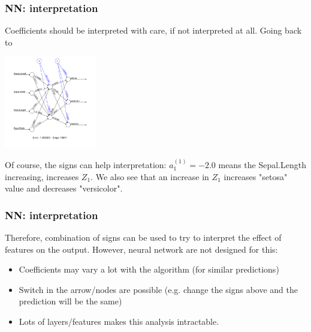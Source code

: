 \begin{frame}
\frametitle{NN: interpretation}
Coefficients should be interpreted with care, if not interpreted at all. Going back to
\begin{center}
\includegraphics[width=4cm]{../../Graphs/NN_Iris.png}
\end{center}
Of course, the signs can help interpretation: $a_1^{(1)}=-2.0$ means the Sepal.Length increasing, increases $Z_1$. We also see that an increase in $Z_1$ increases "setosa" value and decreases "versicolor". 
\end{frame}
\begin{frame}
\frametitle{NN: interpretation}
Therefore, combination of signs can be used to try to interpret the effect of features on the output. However, neural network are not designed for this:
\begin{itemize}
\item Coefficients may vary a lot with the algorithm (for similar predictions)
\item Switch in the arrow/nodes are possible (e.g. change the signs above and the prediction will be the same)
\item Lots of layers/features makes this analysis intractable. 
\end{itemize}
\end{frame}
 
